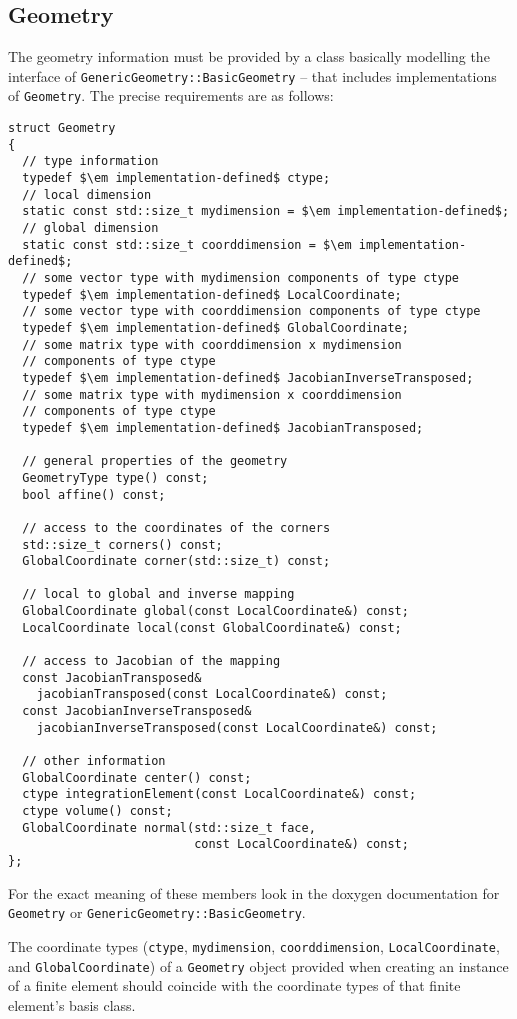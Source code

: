 \documentclass[a4paper,11pt]{article}
\begin{document}
\subsection{Geometry}

The geometry information must be provided by a class basically modelling the
interface of {\tt GenericGeometry::BasicGeometry} -- that includes
implementations of {\tt Geometry}.  The precise requirements are as follows:
\begin{lstlisting}[escapechar=\$]
struct Geometry
{
  // type information
  typedef $\em implementation-defined$ ctype;
  // local dimension
  static const std::size_t mydimension = $\em implementation-defined$;
  // global dimension
  static const std::size_t coorddimension = $\em implementation-defined$;
  // some vector type with mydimension components of type ctype
  typedef $\em implementation-defined$ LocalCoordinate;
  // some vector type with coorddimension components of type ctype
  typedef $\em implementation-defined$ GlobalCoordinate;
  // some matrix type with coorddimension x mydimension
  // components of type ctype
  typedef $\em implementation-defined$ JacobianInverseTransposed;
  // some matrix type with mydimension x coorddimension
  // components of type ctype
  typedef $\em implementation-defined$ JacobianTransposed;

  // general properties of the geometry
  GeometryType type() const;
  bool affine() const;

  // access to the coordinates of the corners
  std::size_t corners() const;
  GlobalCoordinate corner(std::size_t) const;

  // local to global and inverse mapping
  GlobalCoordinate global(const LocalCoordinate&) const;
  LocalCoordinate local(const GlobalCoordinate&) const;

  // access to Jacobian of the mapping
  const JacobianTransposed&
    jacobianTransposed(const LocalCoordinate&) const;
  const JacobianInverseTransposed&
    jacobianInverseTransposed(const LocalCoordinate&) const;

  // other information
  GlobalCoordinate center() const;
  ctype integrationElement(const LocalCoordinate&) const;
  ctype volume() const;
  GlobalCoordinate normal(std::size_t face,
                          const LocalCoordinate&) const;
};
\end{lstlisting}
For the exact meaning of these members look in the doxygen documentation for
{\tt Geometry} or {\tt GenericGeometry::BasicGeometry}.

The coordinate types ({\tt ctype}, {\tt mydimension}, {\tt coorddimension},
{\tt LocalCoordinate}, and {\tt GlobalCoordinate}) of a {\tt Geometry} object
provided when creating an instance of a finite element should coincide with
the coordinate types of that finite element's basis class.
\end{document}
